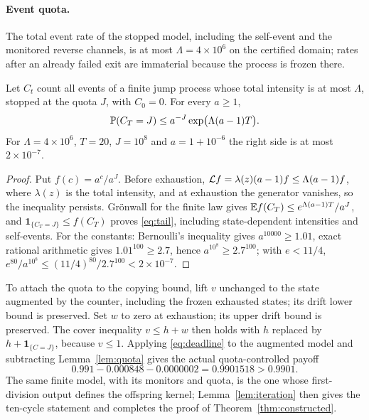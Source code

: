 \paragraph{Event quota.}
The total event rate of the stopped model, including the self-event and the monitored reverse channels, is at most $\Lambda=4\times10^6$ on the certified domain; rates after an already failed exit are immaterial because the process is frozen there.

\begin{lemma}\label{lem:quota}
Let $C_t$ count all events of a finite jump process whose total intensity is at most $\Lambda$, stopped at the quota $J$, with $C_0=0$. For every $a\ge1$,
\begin{equation}\label{eq:tail}
 \mathbb P(C_T=J)\le a^{-J}\exp\bigl(\Lambda(a-1)T\bigr).
\end{equation}
For $\Lambda=4\times10^6$, $T=20$, $J=10^8$ and $a=1+10^{-6}$ the right side is at most $2\times10^{-7}$.
\end{lemma}
\begin{proof}
Put $f(c)=a^c/a^J$. Before exhaustion, $\mathcal L f=\lambda(z)(a-1)f\le\Lambda(a-1)f$, where $\lambda(z)$ is the total intensity, and at exhaustion the generator vanishes, so the inequality persists. Gr\"onwall for the finite law gives $\mathbb E f(C_T)\le e^{\Lambda(a-1)T}/a^J$, and $\mathbf1_{\{C_T=J\}}\le f(C_T)$ proves \eqref{eq:tail}, including state-dependent intensities and self-events. For the constants: Bernoulli's inequality gives $a^{10000}\ge1.01$, exact rational arithmetic gives $1.01^{100}\ge2.7$, hence $a^{10^8}\ge2.7^{100}$; with $e<11/4$, $e^{80}/a^{10^8}\le(11/4)^{80}/2.7^{100}<2\times10^{-7}$.
\end{proof}

To attach the quota to the copying bound, lift $v$ unchanged to the state augmented by the counter, including the frozen exhausted states; its drift lower bound is preserved. Set $w$ to zero at exhaustion; its upper drift bound is preserved. The cover inequality $v\le h+w$ then holds with $h$ replaced by $h+\mathbf1_{\{C=J\}}$, because $v\le1$. Applying \eqref{eq:deadline} to the augmented model and subtracting Lemma~\ref{lem:quota} gives the actual quota-controlled payoff
\[
 0.991-0.000848-0.0000002=0.9901518>0.9901 .
\]
The same finite model, with its monitors and quota, is the one whose first-division output defines the offspring kernel; Lemma~\ref{lem:iteration} then gives the ten-cycle statement and completes the proof of Theorem~\ref{thm:constructed}.

